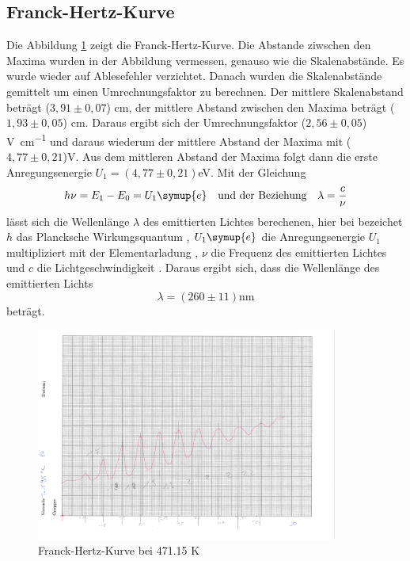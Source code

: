 \subsection{Franck-Hertz-Kurve}
Die Abbildung \ref{fig:8b} zeigt die Franck-Hertz-Kurve. Die Abstande ziwschen
den Maxima wurden in der Abbildung vermessen, genauso wie die Skalenabstände.
Es wurde wieder auf Ablesefehler verzichtet. Danach
wurden die Skalenabstände gemittelt um einen Umrechnungsfaktor zu berechnen. Der
mittlere Skalenabstand beträgt ($3,91 \pm 0,07$) \si{\centi \meter}, der mittlere
Abstand zwischen den Maxima beträgt ($1,93 \pm 0,05$) \si{\centi \meter}. Daraus
ergibt sich der Umrechnungsfaktor ($2,56 \pm 0,05$) \si{\volt \per \centi \meter}
und daraus wiederum der mittlere Abstand der Maxima mit ($4,77 \pm 0,21$)\si{\volt}.
Aus dem mittleren Abstand der Maxima folgt dann die erste Anregungsenergie
$ U_1 = \left(4,77 \pm 0,21 \right) $\si{ \eV}. Mit der Gleichung
\begin{equation*}
  h\nu = E_1 - E_0 = U_1 \symup{e}
 \quad \text{und der Beziehung}\quad
   \lambda = \frac{c}{\nu}
\end{equation*}
lässt sich die Wellenlänge $\lambda $ des emittierten Lichtes berechenen, hier
bei bezeichet $h$ das Plancksche Wirkungsquantum \cite{scipy}, $ U_1 \symup{e}$ die
Anregungsenergie $U_1$ multipliziert mit der Elementarladung \cite{scipy},
 $\nu$ die Frequenz des emittierten Lichtes und $c$ die Lichtgeschwindigkeit \cite{scipy}.
Daraus ergibt sich, dass die Wellenlänge des emittierten Lichts
\begin{equation*}
  \lambda = \left( 260 \pm 11 \right) \si{\nano \meter}
\end{equation*}
beträgt.





\begin{figure}
  \centering
  \includegraphics[height= 7cm]{8b.png}
  \caption{Franck-Hertz-Kurve bei 471.15 K}
  \label{fig:8b}
\end{figure}

